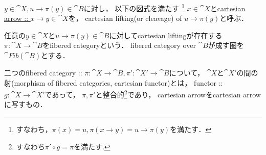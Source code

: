 \documentclass[a4paper, dvipdfmx]{jsarticle}
\newcommand{\Fib}[1]{\cat{Fib}(\cat{#1})}
\begin{document}
\begin{Def}
\begin{myenum}
\item
    $y \in \cat{X}, u \to \pi(y) \in \cat{B}$に対し，
    以下の図式を満たす
    \footnote{すなわち，$\pi(x)=u, \pi(x \to y)=u \to \pi(y)$を満たす．}
    \underline{$x \in \cat{X}$とcartesian arrow :: $x \to y \in \cat{X}$}を，
    cartesian lifting(or cleavage) of $u \to \pi(y)$と呼ぶ．
    \begin{center}
    \end{center}

\item
    任意の$y \in \cat{X}$と$u \to \pi(y) \in \cat{B}$に対してcartesian liftingが存在する
    $\pi \colon \cat{X} \to \cat{B}$をfibered categoryという．
    fibered category over $\cat{B}$が成す圏を$\Fib{B}$とする．

\item
    二つのfibered category :: 
    $\pi \colon \cat{X} \to \cat{B}, \pi' \colon \cat{X}' \to \cat{B}$について，
    $\cat{X}$と$\cat{X}'$の間の射(morphism of fibered categories, cartesian functor)とは，
    functor :: $g \colon \cat{X} \to \cat{X}'$であって，
    $\pi, \pi'$と整合的\footnote{ すなわち$\pi' \circ g=\pi$を満たす. }であり，
    cartesian arrowをcartesian arrowに写すもの．

\item
\end{myenum}
\end{Def}
\end{document}
